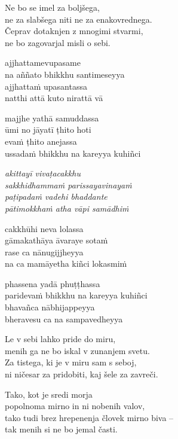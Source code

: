 Ne bo se imel za boljšega,\\
ne za slabšega niti ne za enakovrednega.\\
Čeprav dotaknjen z mnogimi stvarmi,\\
ne bo zagovarjal misli o sebi.


\clearpage

ajjhattamevupasame\\
na aññato bhikkhu santimeseyya\\
ajjhattaṁ upasantassa\\
natthi attā kuto nirattā vā

majjhe yathā samuddassa\\
ūmi no jāyatī ṭhito hoti\\
evaṁ ṭhito anejassa\\
ussadaṁ bhikkhu na kareyya kuhiñci

\emph{akittayī vivaṭacakkhu\\
sakkhidhammaṁ parissayavinayaṁ}\\
\emph{paṭipadaṁ vadehi bhaddante\\
pātimokkhaṁ atha vāpi samādhiṁ}

cakkhūhi neva lolassa\\
gāmakathāya āvaraye sotaṁ\\
rase ca nānugijjheyya\\
na ca mamāyetha kiñci lokasmiṁ

phassena yadā phuṭṭhassa\\
paridevaṁ bhikkhu na kareyya kuhiñci\\
bhavañca nābhijappeyya\\
bheravesu ca na sampavedheyya


\clearpage

Le v sebi lahko pride do miru,\\
menih ga ne bo iskal v zunanjem svetu.\\
Za tistega, ki je v miru sam s seboj,\\
ni ničesar za pridobiti, kaj šele za zavreči.

Tako, kot je sredi morja\\
popolnoma mirno in ni nobenih valov,\\
tako tudi brez hrepenenja človek mirno biva --\\
tak menih si ne bo jemal časti.

